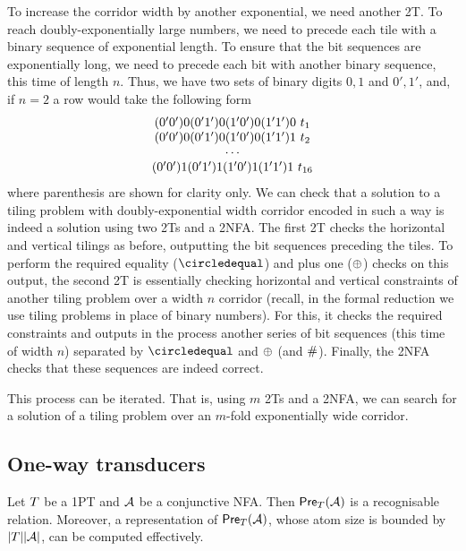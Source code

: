 To increase the corridor width by another exponential, we need another 2T.
To reach doubly-exponentially large numbers, we need to precede each tile with a binary sequence of exponential length.
To ensure that the bit sequences are exponentially long, we need to precede each bit with another binary sequence, this time of length $n$.
Thus, we have two sets of binary digits $0,1$ and $0', 1'$, and, if $n = 2$ a row would take the following form
\[
    \begin{array}{c}
        (0'0') 0 (0'1') 0 (1'0') 0 (1'1') 0\ t_1 \\
        (0'0') 0 (0'1') 0 (1'0') 0 (1'1') 1\ t_2 \\
        \cdots \\
        (0'0') 1 (0'1') 1 (1'0') 1 (1'1') 1\ t_{16} \\
    \end{array}
\]
where parenthesis are shown for clarity only.
We can check that a solution to a tiling problem with doubly-exponential width corridor encoded in such a way is indeed a solution using two 2Ts and a 2NFA.
The first 2T checks the horizontal and vertical tilings as before, outputting the bit sequences preceding the tiles.
To perform the required equality ($\numeq$) and plus one ($\oplus$) checks on this output, the second 2T is essentially checking horizontal and vertical constraints of another tiling problem over a width $n$ corridor
(recall, in the formal reduction we use tiling problems in place of binary numbers).
For this, it checks the required constraints and outputs in the process another series of bit sequences (this time of width $n$) separated by $\numeq$ and $\oplus$ (and $\#$).
Finally, the 2NFA checks that these sequences are indeed correct.

This process can be iterated.
That is, using $m$ 2Ts and a 2NFA, we can search for a solution of a tiling problem over an $m$-fold exponentially wide corridor.




\subsection{One-way transducers}


\begin{lemma}\label{lem-1pt}
Let $T$ be a 1PT and $\mathcal{A}$ be a conjunctive NFA. Then $\textsf{Pre}_{T}(\mathcal{A})$ is a recognisable relation. Moreover, a representation of $\textsf{Pre}_{T}(\mathcal{A})$, whose atom size is bounded by $|T||\mathcal{A}|$, can be computed effectively.
\end{lemma}

